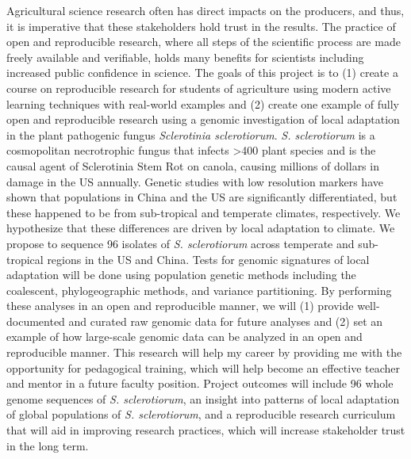 \documentclass[12pt,letterpaper]{article}
\begin{document}
Agricultural science research often has direct impacts on the producers, and thus, it is imperative that these stakeholders hold trust in the results. 
The practice of open and reproducible research, where all steps of the scientific process are made freely available and verifiable, holds many benefits for scientists including increased public confidence in science.
The goals of this project is to (1) create a course on reproducible research for students of agriculture using modern active learning techniques with real-world examples and (2) create one example of fully open and reproducible research using a genomic investigation of local adaptation in the plant pathogenic fungus \textit{Sclerotinia sclerotiorum}.
\textit{S. sclerotiorum} is a cosmopolitan necrotrophic fungus that infects >400 plant species and is the causal agent of Sclerotinia Stem Rot on canola, causing millions of dollars in damage in the US annually.
Genetic studies with low resolution markers have shown that populations in China and the US are significantly differentiated, but these happened to be from sub-tropical and temperate climates, respectively. 
We hypothesize that these differences are driven by local adaptation to climate. 
We propose to sequence 96 isolates of \textit{S. sclerotiorum} across temperate and sub-tropical regions in the US and China. 
Tests for genomic signatures of local adaptation will be done using population genetic methods including the coalescent, phylogeographic methods, and variance partitioning.
By performing these analyses in an open and reproducible manner, we will (1) provide well-documented and curated raw genomic data for future analyses and (2) set an example of how large-scale genomic data can be analyzed in an open and reproducible manner.
This research will help my career by providing me with the opportunity for pedagogical training, which will help become an effective teacher and mentor in a future faculty position.
Project outcomes will include 96 whole genome sequences of \textit{S. sclerotiorum}, an insight into patterns of local adaptation of global populations of \textit{S. sclerotiorum}, and a reproducible research curriculum that will aid in improving research practices, which will increase stakeholder trust in the long term.
\end{document}
